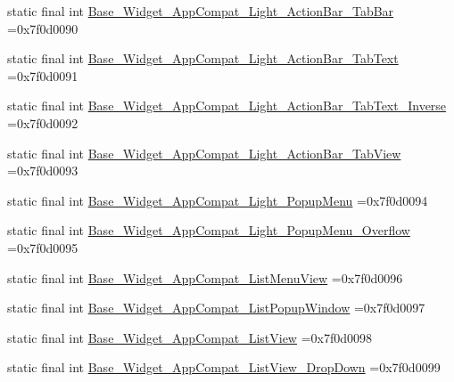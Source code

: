 \begin{DoxyCompactItemize}
\item 
static final int \mbox{\hyperlink{classbr_1_1unb_1_1cic_1_1mp_1_1marketmaster_1_1R_1_1style_a089efbf75d5fcfce0d71e335b6d25912}{Base\+\_\+\+Widget\+\_\+\+App\+Compat\+\_\+\+Light\+\_\+\+Action\+Bar\+\_\+\+Tab\+Bar}} =0x7f0d0090
\item 
static final int \mbox{\hyperlink{classbr_1_1unb_1_1cic_1_1mp_1_1marketmaster_1_1R_1_1style_ad8e56847662f41ccabf843e429912021}{Base\+\_\+\+Widget\+\_\+\+App\+Compat\+\_\+\+Light\+\_\+\+Action\+Bar\+\_\+\+Tab\+Text}} =0x7f0d0091
\item 
static final int \mbox{\hyperlink{classbr_1_1unb_1_1cic_1_1mp_1_1marketmaster_1_1R_1_1style_a37af52fe19045a15277166dd0cf842bb}{Base\+\_\+\+Widget\+\_\+\+App\+Compat\+\_\+\+Light\+\_\+\+Action\+Bar\+\_\+\+Tab\+Text\+\_\+\+Inverse}} =0x7f0d0092
\item 
static final int \mbox{\hyperlink{classbr_1_1unb_1_1cic_1_1mp_1_1marketmaster_1_1R_1_1style_ae1584011a6d3fcf3dd583855b70d2179}{Base\+\_\+\+Widget\+\_\+\+App\+Compat\+\_\+\+Light\+\_\+\+Action\+Bar\+\_\+\+Tab\+View}} =0x7f0d0093
\item 
static final int \mbox{\hyperlink{classbr_1_1unb_1_1cic_1_1mp_1_1marketmaster_1_1R_1_1style_ab1441a4aeafa7c4868edb71e76d93b1a}{Base\+\_\+\+Widget\+\_\+\+App\+Compat\+\_\+\+Light\+\_\+\+Popup\+Menu}} =0x7f0d0094
\item 
static final int \mbox{\hyperlink{classbr_1_1unb_1_1cic_1_1mp_1_1marketmaster_1_1R_1_1style_a2fcc2d8df3df078f8c4fcaa637022ead}{Base\+\_\+\+Widget\+\_\+\+App\+Compat\+\_\+\+Light\+\_\+\+Popup\+Menu\+\_\+\+Overflow}} =0x7f0d0095
\item 
static final int \mbox{\hyperlink{classbr_1_1unb_1_1cic_1_1mp_1_1marketmaster_1_1R_1_1style_a55f2e2799a3620ab6674e81e3178c880}{Base\+\_\+\+Widget\+\_\+\+App\+Compat\+\_\+\+List\+Menu\+View}} =0x7f0d0096
\item 
static final int \mbox{\hyperlink{classbr_1_1unb_1_1cic_1_1mp_1_1marketmaster_1_1R_1_1style_a5aa5e9bebc68f1483887b8f135f69863}{Base\+\_\+\+Widget\+\_\+\+App\+Compat\+\_\+\+List\+Popup\+Window}} =0x7f0d0097
\item 
static final int \mbox{\hyperlink{classbr_1_1unb_1_1cic_1_1mp_1_1marketmaster_1_1R_1_1style_a841202ee8655dee395f8df52345649db}{Base\+\_\+\+Widget\+\_\+\+App\+Compat\+\_\+\+List\+View}} =0x7f0d0098
\item 
static final int \mbox{\hyperlink{classbr_1_1unb_1_1cic_1_1mp_1_1marketmaster_1_1R_1_1style_a5e99bd6c4b2c71322757aa6428670ee8}{Base\+\_\+\+Widget\+\_\+\+App\+Compat\+\_\+\+List\+View\+\_\+\+Drop\+Down}} =0x7f0d0099

\end{DoxyCompactItemize}
